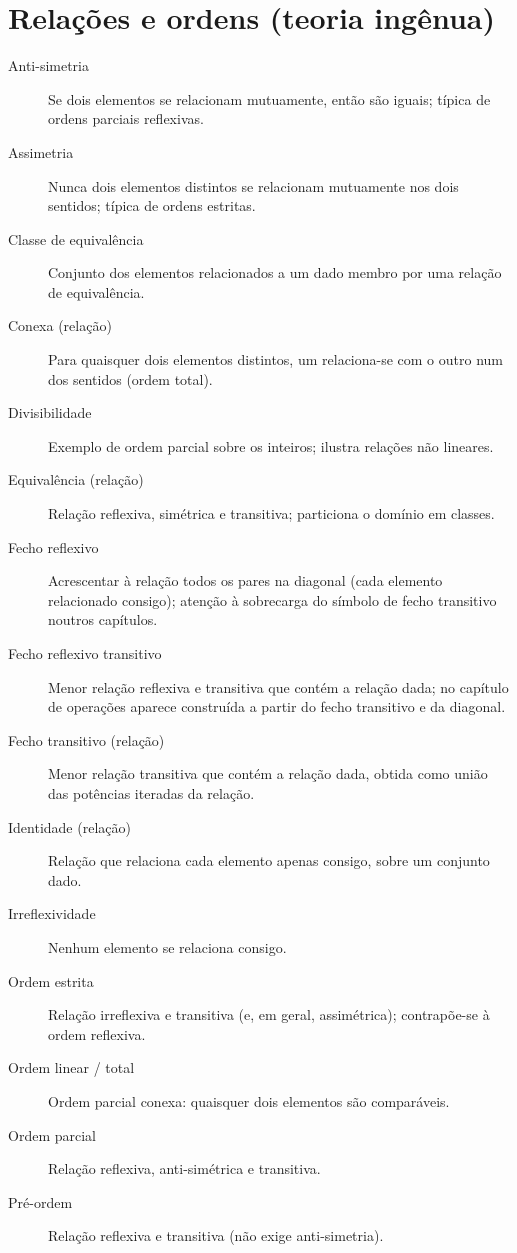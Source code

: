 \section*{Relações e ordens (teoria ingênua)}

\begin{description}
\item[Anti-simetria] Se dois elementos se relacionam mutuamente, então são iguais; típica de ordens parciais reflexivas.
\item[Assimetria] Nunca dois elementos distintos se relacionam mutuamente nos dois sentidos; típica de ordens estritas.
\item[Classe de equivalência] Conjunto dos elementos relacionados a um dado membro por uma relação de equivalência.
\item[Conexa (relação)] Para quaisquer dois elementos distintos, um relaciona-se com o outro num dos sentidos (ordem total).
\item[Divisibilidade] Exemplo de ordem parcial sobre os inteiros; ilustra relações não lineares.
\item[Equivalência (relação)] Relação reflexiva, simétrica e transitiva; particiona o domínio em classes.
\item[Fecho reflexivo] Acrescentar à relação todos os pares na diagonal (cada elemento relacionado consigo); atenção à sobrecarga do símbolo de fecho transitivo noutros capítulos.
\item[Fecho reflexivo transitivo] Menor relação reflexiva e transitiva que contém a relação dada; no capítulo de operações aparece construída a partir do fecho transitivo e da diagonal.
\item[Fecho transitivo (relação)] Menor relação transitiva que contém a relação dada, obtida como união das potências iteradas da relação.
\item[Identidade (relação)] Relação que relaciona cada elemento apenas consigo, sobre um conjunto dado.
\item[Irreflexividade] Nenhum elemento se relaciona consigo.
\item[Ordem estrita] Relação irreflexiva e transitiva (e, em geral, assimétrica); contrapõe-se à ordem reflexiva.
\item[Ordem linear / total] Ordem parcial conexa: quaisquer dois elementos são comparáveis.
\item[Ordem parcial] Relação reflexiva, anti-simétrica e transitiva.
\item[Pré-ordem] Relação reflexiva e transitiva (não exige anti-simetria).

\end{description}
